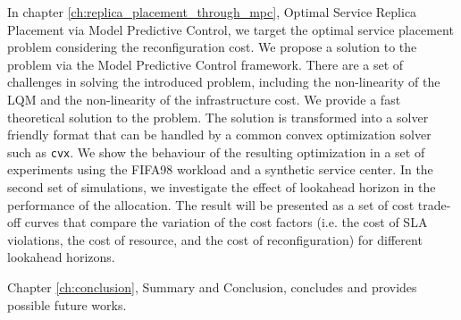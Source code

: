  In chapter \ref{ch:replica_placement_through_mpc}, Optimal Service Replica Placement via Model Predictive Control, we target the optimal service placement problem considering the reconfiguration cost. We  propose a solution to the problem via the Model Predictive Control framework.  
There are a set of challenges in solving the introduced problem, including the non-linearity of the LQM and the non-linearity of the infrastructure cost. We provide a fast theoretical solution to the problem. The solution is transformed into a solver friendly format that can be handled by a common convex optimization solver such as \texttt{cvx}.
We show the behaviour of the resulting optimization in a set of experiments using the FIFA98 workload and a synthetic service center. In the second set of simulations, we investigate the effect of lookahead horizon in the performance of the allocation. The result will be presented as a set of cost trade-off curves that compare the variation of the cost factors (i.e. the cost of SLA violations, the cost of resource, and the cost of reconfiguration) for different lookahead horizons.

  Chapter \ref{ch:conclusion}, Summary and Conclusion, concludes and provides possible future works.      



